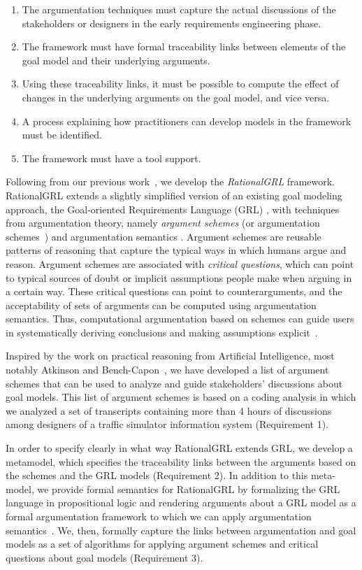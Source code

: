 \begin{enumerate}
\item 
The argumentation techniques must capture the actual discussions of the stakeholders or designers in the early requirements engineering phase.
\item 
The framework must have formal traceability links between elements of the goal model and their underlying arguments.
\item 
Using these traceability links, it must be possible to compute the effect of changes in the underlying arguments on the goal model, and vice versa.
\item 
A process explaining how practitioners can develop models in the framework must be identified.
\item 
The framework must have a tool support.
\end{enumerate}

Following from our previous work~\cite{vanzee-etal:renext2015,vanZee-etal:er2016}, we develop the \emph{RationalGRL} framework. RationalGRL extends a slightly simplified version of an existing goal modeling approach, the Goal-oriented Requirements Language (GRL) \cite{Amyot:2010:EGM:1841349.1841356}, with techniques from argumentation theory, namely \emph{argument schemes} (or argumentation schemes~\cite{walton-etal2008}) and argumentation semantics \cite{Dung1995}. Argument schemes are reusable patterns of reasoning that capture the typical ways in which humans argue and reason. Argument schemes are associated with \emph{critical questions}, which can point to typical sources of doubt or implicit assumptions people make when arguing in a certain way. These critical questions can point to counterarguments, and the acceptability of sets of arguments can be computed using argumentation semantics. Thus, computational argumentation based on schemes can guide users in systematically deriving conclusions and making assumptions explicit~\cite{bexEtal2003,murukannaiah2015}. 

Inspired by the work on practical reasoning from Artificial Intelligence, most notably Atkinson and Bench-Capon~\cite{atkinson2007}, we have developed a list of argument schemes that can be used to analyze and guide stakeholders' discussions about goal models. This list of argument schemes is based on a coding analysis in which we analyzed a set of transcripts containing more than 4 hours of discussions among designers of a traffic simulator information system (Requirement 1). 

In order to specify clearly in what way RationalGRL extends GRL, we develop a metamodel, which specifies the traceability links between the arguments based on the schemes and the GRL models (Requirement 2). In addition to this meta-model, we provide formal semantics for RationalGRL by formalizing the GRL language in propositional logic and rendering arguments about a GRL model as a formal argumentation framework to which we can apply argumentation semantics~\cite{Dung1995}. We, then, formally capture the links between argumentation and goal models as a set of algorithms for applying argument schemes and critical questions about goal models (Requirement 3). 

